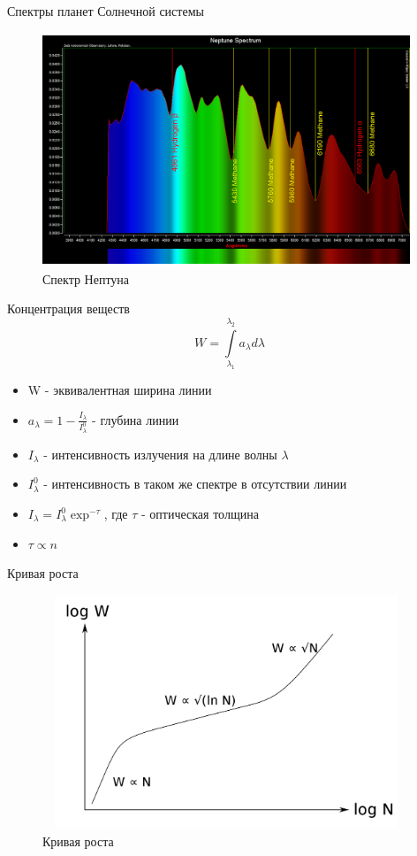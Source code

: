 \documentclass[
]{beamer}
\begin{document}
	\begin{frame}{Спектры планет Солнечной системы}
		\begin{figure}[H]
			\centering
			\includegraphics[width=11cm, height=7cm]{нептун.png}
			\caption{Спектр Нептуна}
		\end{figure}
	\end{frame}

	\begin{frame}{Концентрация веществ}
		$$W=\int\limits_{\lambda_1}^{\lambda_2}a_{\lambda}d\lambda$$
		\begin{itemize}
			\item W - эквивалентная ширина линии
			\item $a_\lambda=1-\displaystyle\frac{I_\lambda}{I^0_\lambda}$ - глубина линии
			\item $I_\lambda$ - интенсивность излучения на длине волны $\lambda$
			\item $I^0_\lambda$ - интенсивность в таком же спектре в отсутствии линии
			\item $I_\lambda=I^0_\lambda\exp^{-\tau}$, где $\tau$ - оптическая толщина
			\item $\tau\propto n$
		\end{itemize}
	\end{frame}

	\begin{frame}{Кривая роста}
		\begin{figure}[H]
			\centering
			\includegraphics[width=11cm, height=7cm]{кривая_роста.png}
			\caption{Кривая роста}
		\end{figure}
	\end{frame}
\end{document}
